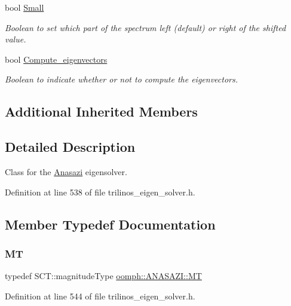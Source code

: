 \begin{DoxyCompactItemize}
bool \hyperlink{classoomph_1_1ANASAZI_abb61aa274f84bda2752fb0e7bcc4cbee}{Small}
\begin{DoxyCompactList}\small\item\em Boolean to set which part of the spectrum left (default) or right of the shifted value. \end{DoxyCompactList}\item 
bool \hyperlink{classoomph_1_1ANASAZI_a4493c071c706cab869df34248f2dcdbf}{Compute\+\_\+eigenvectors}
\begin{DoxyCompactList}\small\item\em Boolean to indicate whether or not to compute the eigenvectors. \end{DoxyCompactList}\end{DoxyCompactItemize}
\subsection*{Additional Inherited Members}


\subsection{Detailed Description}
Class for the \hyperlink{namespaceAnasazi}{Anasazi} eigensolver. 

Definition at line 538 of file trilinos\+\_\+eigen\+\_\+solver.\+h.



\subsection{Member Typedef Documentation}
\mbox{\label{classoomph_1_1ANASAZI_a8c8982a3b6f716d4ea9b497235351cf2}} 
\subsubsection{\texorpdfstring{MT}{MT}}
{\footnotesize\ttfamily typedef S\+C\+T\+::magnitude\+Type \hyperlink{classoomph_1_1ANASAZI_a8c8982a3b6f716d4ea9b497235351cf2}{oomph\+::\+A\+N\+A\+S\+A\+Z\+I\+::\+MT}\hspace{0.3cm}{\ttfamily [private]}}



Definition at line 544 of file trilinos\+\_\+eigen\+\_\+solver.\+h.

